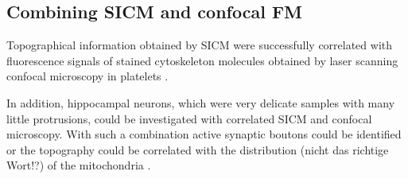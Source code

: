 


\subsection{Combining SICM and confocal FM}

Topographical information obtained by SICM were successfully correlated with fluorescence signals
of stained cytoskeleton molecules obtained by laser scanning confocal microscopy in platelets 
\cite{Seifert2017}. 

In addition, hippocampal neurons, which were very delicate samples with many little protrusions, 
could be investigated with correlated SICM and confocal microscopy. With such a combination active
synaptic boutons could be identified \cite{Novak2013} or the topography could be correlated with 
the distribution (nicht das richtige Wort!?) of the mitochondria \cite{Takahashi2019}.

